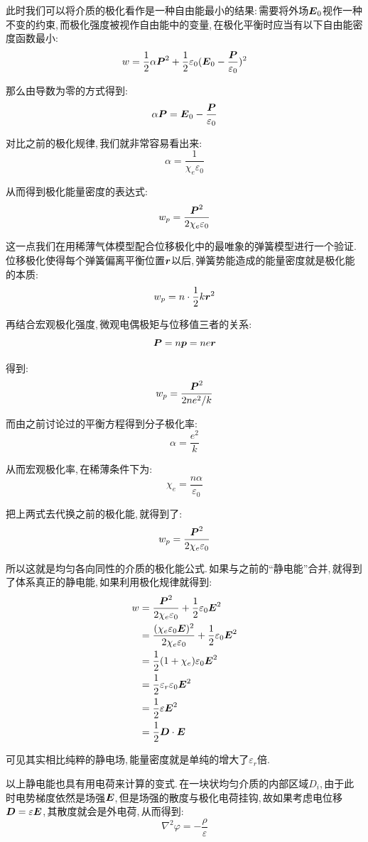 此时我们可以将介质的极化看作是一种自由能最小的结果:\,需要将外场$\boldsymbol{E}_0$视作一种不变的约束,\,而极化强度被视作自由能中的变量,\,在极化平衡时应当有以下自由能密度函数最小:
\[w=\frac{1}{2}\alpha \boldsymbol{P}^2+\frac{1}{2}\varepsilon_0 (\boldsymbol{E}_0-\frac{\boldsymbol{P}}{\varepsilon_0})^2\]

那么由导数为零的方式得到:
\[\alpha\boldsymbol{P}=\boldsymbol{E}_0-\frac{\boldsymbol{P}}{\varepsilon_0}\]

对比之前的极化规律,\,我们就非常容易看出来:
\[\alpha=\frac{1}{\chi_e\varepsilon_0}\]

从而得到极化能量密度的表达式:
\[w_p=\frac{\boldsymbol{P}^2}{2\chi_e\varepsilon_0}\]

这一点我们在用稀薄气体模型配合位移极化中的最唯象的弹簧模型进行一个验证.\,位移极化使得每个弹簧偏离平衡位置$\boldsymbol{r}$以后,\,弹簧势能造成的能量密度就是极化能的本质:
\[w_p=n\cdot\frac{1}{2}k\boldsymbol{r}^2\]

再结合宏观极化强度,\,微观电偶极矩与位移值三者的关系:
\[\boldsymbol{P}=n\boldsymbol{p}=ne\boldsymbol{r}\]

得到:
\[w_p=\frac{\boldsymbol{P}^2}{2ne^2/k}\]

而由之前讨论过的平衡方程得到分子极化率:
\[\alpha=\frac{e^2}{k}\]

从而宏观极化率,\,在稀薄条件下为:
\[\chi_e=\frac{n\alpha }{\varepsilon_0}\]

把上两式去代换之前的极化能,\,就得到了:
\[w_p=\frac{\boldsymbol{P}^2}{2\chi_e\varepsilon_0}\]

所以这就是均匀各向同性的介质的极化能公式.\,如果与之前的``静电能''合并,\,就得到了体系真正的静电能,\,如果利用极化规律就得到:
\begin{align*}
w 	&=\frac{\boldsymbol{P}^2}{2\chi_e\varepsilon_0}+\frac{1}{2}\varepsilon_0 \boldsymbol{E}^2\\
	&=\frac{(\chi_e\varepsilon_0\boldsymbol{E})^2}{2\chi_e\varepsilon_0}+\frac{1}{2}\varepsilon_0 \boldsymbol{E}^2\\
	&=\frac{1}{2}(1+\chi_e)\varepsilon_0\boldsymbol{E}^2\\
	&=\frac{1}{2}\varepsilon_r\varepsilon_0\boldsymbol{E}^2\\
	&=\frac{1}{2}\varepsilon\boldsymbol{E}^2\\
	&=\frac{1}{2}\boldsymbol{D}\cdot \boldsymbol{E}
\end{align*}

可见其实相比纯粹的静电场,\,能量密度就是单纯的增大了$\varepsilon_r$倍.

以上静电能也具有用电荷来计算的变式.\,在一块状均匀介质的内部区域$D_i$,\,由于此时电势梯度依然是场强$\boldsymbol{E}$,\,但是场强的散度与极化电荷挂钩,\,故如果考虑电位移$\boldsymbol{D}=\varepsilon\boldsymbol{E}$,\,其散度就会是外电荷,\,从而得到:
\[\nabla^2\varphi=-\frac{\rho}{\varepsilon}\]

